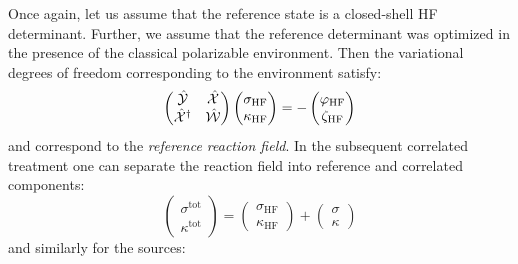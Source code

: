 Once again, let us assume that the reference state is a closed-shell
\acrshort{HF} determinant. Further, we assume that the reference determinant
was optimized in the presence of the classical polarizable environment.
Then the variational degrees of freedom corresponding to the environment
satisfy:
\begin{equation}
  \begin{pmatrix}
    \hat{\mathcal{Y}} & \hat{\mathcal{X}} \\
    \hat{\mathcal{X}}^\dagger & \hat{\mathcal{W}}
  \end{pmatrix}
  \begin{pmatrix}
   \sigma_\mathrm{HF} \\
   \kappa_\mathrm{HF}
  \end{pmatrix}
  =
  -
  \begin{pmatrix}
   \varphi_\mathrm{HF} \\
   \zeta_\mathrm{HF}
  \end{pmatrix}
\end{equation}
and correspond to the \emph{reference reaction field}.
In the subsequent correlated treatment one can separate the reaction
field into reference and correlated components:
\begin{equation}
  \begin{pmatrix}
   \sigma^\mathrm{tot} \\
   \kappa^\mathrm{tot}
  \end{pmatrix}
  =
  \begin{pmatrix}
   \sigma_\mathrm{HF} \\
   \kappa_\mathrm{HF}
  \end{pmatrix}
  +
  \begin{pmatrix}
   \sigma \\
   \kappa
  \end{pmatrix}
\end{equation}
and similarly for the sources:
